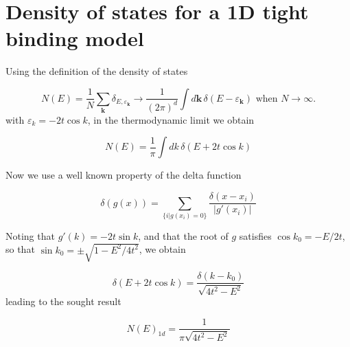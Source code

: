 \chapter{Density of states for a 1D tight binding model}
\label{ap:dos1d}

\pagebreak

Using the definition of the density of states

\begin{equation}
N ( E ) = \frac{1}{N} \sum_{\bm k} \delta_{E,\varepsilon_{\bm k}} \rightarrow \frac{1}{(2\pi)^d} \int d\bm k \, \delta ( E - \varepsilon_{\bm k})\,\, \text{when}\,\, N\rightarrow \infty.
\end{equation}
with $\varepsilon_k = - 2 t \cos k$, in the thermodynamic limit we obtain

\begin{equation}
N ( E ) = \frac{1}{\pi} \int d k \, \delta ( E + 2t \cos k)
\end{equation}

Now we use a well known property of the delta function

\begin{equation}
\delta ( g(x) ) = \sum_{ \{i | g(x_i) = 0\} } \frac{\delta ( x - x_i) }{| g' ( x_i) |}
\end{equation}

Noting that $g'(k) = - 2 t \sin k$, and that the root of $g$ satisfies $\cos k_0 = - E / 2t$, so that $\sin k_0 = \pm \sqrt{1 - E^2 / 4 t^2}$, we obtain

\begin{equation}
\delta ( E + 2 t \cos k) = \frac{\delta ( k - k_0 ) }{ \sqrt{4t^2 - E^2 }}
\end{equation}
leading to the sought result

\begin{equation}
N ( E )_{1d} = \frac{1}{\pi \sqrt{4 t^2 - E^2}}
\end{equation}
